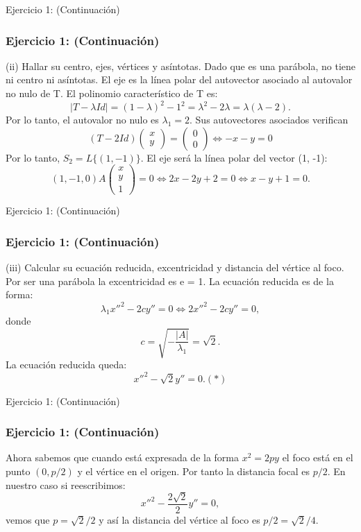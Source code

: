 \documentclass[xcolor={dvipsnames},aspectratio=169,10pt]{beamer}
\begin{document}
\begin{frame}{Ejercicio 1: (Continuación)}
  \frametitle{Ejercicio 1: (Continuación)}
    (ii) Hallar su centro, ejes, vértices y asíntotas.
    Dado que es una parábola, no tiene ni centro ni asíntotas.
    El eje es la línea polar del autovector asociado al autovalor no nulo de T.
    El polinomio característico de T es:
    \[|T - \lambda Id| = (1 - \lambda)^2 - 1^2 = \lambda^2 - 2\lambda = \lambda(\lambda - 2).\]
    Por lo tanto, el autovalor no nulo es $\lambda_1 = 2$. Sus autovectores asociados verifican
    \[(T - 2Id) \begin{pmatrix} x \\ y \end{pmatrix} = \begin{pmatrix} 0 \\ 0 \end{pmatrix} \Leftrightarrow -x - y = 0\]
    Por lo tanto, $S_2 = L\{(1, -1)\}$.
    El eje será la línea polar del vector (1, -1):
    \[(1, -1, 0) A \begin{pmatrix} x \\ y \\ 1 \end{pmatrix} = 0 \Leftrightarrow 2x - 2y + 2 = 0 \Leftrightarrow x - y + 1 = 0.\]
\end{frame}

\begin{frame}{Ejercicio 1: (Continuación)}
  \frametitle{Ejercicio 1: (Continuación)}
    (iii) Calcular su ecuación reducida, excentricidad y distancia del vértice al foco.
    Por ser una parábola la excentricidad es e = 1.
    La ecuación reducida es de la forma:
    \[\lambda_1x''^2 - 2cy'' = 0 \Leftrightarrow 2x''^2 - 2cy'' = 0,\]
    donde
    \[c = \sqrt{-\frac{|A|}{\lambda_1}} = \sqrt{2}.\]
    La ecuación reducida queda:
    \[x''^2 - \sqrt{2}y'' = 0. (*)\]
\end{frame}

\begin{frame}{Ejercicio 1: (Continuación)}
  \frametitle{Ejercicio 1: (Continuación)}
    Ahora sabemos que cuando está expresada de la forma $x^2 = 2py$ el foco está en el punto $(0, p/2)$ y el vértice en el origen. Por tanto la distancia focal es $p/2$. En nuestro caso si reescribimos:
    \[x''^2 - \frac{2\sqrt{2}}{2}y'' = 0,\]
    vemos que $p = \sqrt{2}/2$ y así la distancia del vértice al foco es $p/2 = \sqrt{2}/4$.
\end{frame}
\end{document}
